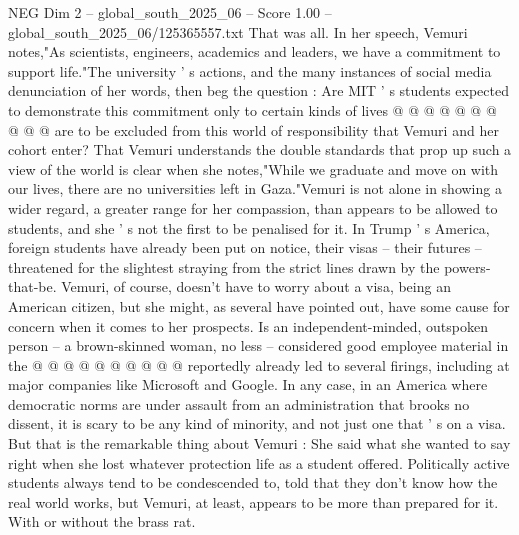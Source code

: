 \begin{textsample}{NEG Dim 2 – global\_south\_2025\_06 – Score 1.00 – global\_south\_2025\_06/125365557.txt}
That was all.
In her speech, Vemuri notes,"As scientists, engineers, academics and leaders, we have a commitment to support life."The university ' s actions, and the many instances of social media denunciation of her words, then beg the question : Are MIT ' s students expected to demonstrate this commitment only to certain kinds of lives @ @ @ @ @ @ @ @ @ @ are to be excluded from this world of responsibility that Vemuri and her cohort enter?
That Vemuri understands the double standards that prop up such a view of the world is clear when she notes,"While we graduate and move on with our lives, there are no universities left in Gaza."Vemuri is not alone in showing a wider regard, a greater range for her compassion, than appears to be allowed to students, and she ' s not the first to be penalised for it.
In Trump ' s America, foreign students have already been put on notice, their visas -- their futures -- threatened for the slightest straying from the strict lines drawn by the powers-that-be.
Vemuri, of course, doesn't have to worry about a visa, being an American citizen, but she might, as several have pointed out, have some cause for concern when it comes to her prospects.
Is an independent-minded, outspoken person -- a brown-skinned woman, no less -- considered good employee material in the @ @ @ @ @ @ @ @ @ @ reportedly already led to several firings, including at major companies like Microsoft and Google.
In any case, in an America where democratic norms are under assault from an administration that brooks no dissent, it is scary to be any kind of minority, and not just one that ' s on a visa.
But that is the remarkable thing about Vemuri : She said what she wanted to say right when she lost whatever protection life as a student offered.
Politically active students always tend to be condescended to, told that they don't know how the real world works, but Vemuri, at least, appears to be more than prepared for it.
With or without the brass rat.

\end{textsample}
